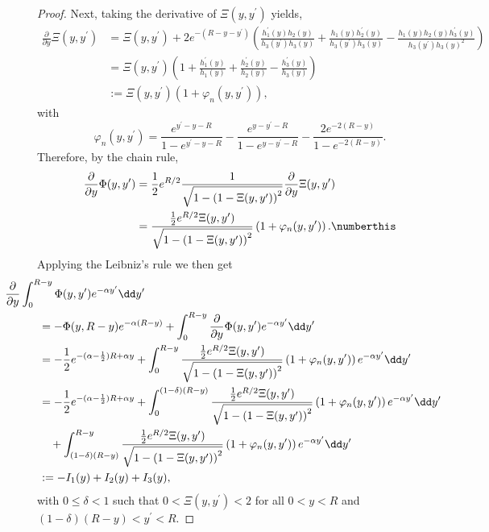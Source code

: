 \begin{proof}
Next, taking the derivative of $\Xi(y,y^\prime)$ yields,
\begin{align*}
	\frac{\partial}{\partial y} \Xi(y,y^\prime) &= \Xi(y,y^\prime) + 2 e^{-(R - y - y^\prime)}
		\left(\frac{h_1^\prime(y) h_2(y)}{h_3(y^\prime) h_3(y)} + \frac{h_1(y)h_2^\prime(y)}{h_3(y^\prime) h_3(y)}
		- \frac{h_1(y) h_2(y) h_3^\prime(y)}{h_3(y^\prime) h_3(y)^2}\right)\\
	&= \Xi(y,y^\prime)\left(1 + \frac{h_1^\prime(y)}{h_1(y)} + \frac{h_2^\prime(y)}{h_2(y)} 
		- \frac{h_3^\prime(y)}{h_3(y)}\right)\\
	&:= \Xi(y,y^\prime)\left(1 + \varphi_n(y,y^\prime)\right),
\end{align*}
with
\[
	\varphi_n(y,y^\prime) = \frac{e^{y^\prime - y- R}}{1 - e^{y^\prime - y - R}} 
	- \frac{e^{y - y^\prime - R}}{1 - e^{y - y^\prime - R}} - \frac{2e^{-2(R - y)}}{1 - e^{-2(R-y)}}. 
\]
Therefore, by the chain rule,
\begin{align*}
	\frac{\partial}{\partial y} \Phi(y, y^\prime)
	&= \frac{1}{2}e^{R/2} \frac{1}{\sqrt{1 - \left(1 - \Xi(y,y^\prime)\right)^2}} 
		\frac{\partial}{\partial y} \Xi(y,y^\prime)\\
	&=  \frac{ \frac{1}{2}e^{R/2} \Xi(y,y^\prime)}{\sqrt{1 - \left(1 - \Xi(y,y^\prime)\right)^2}}\left(1 + 
		\varphi_n(y,y^\prime)\right). \numberthis \label{eq:derivative_Phi}
\end{align*}
Applying the Leibniz's rule we then get
\begin{align*}
	&\hspace{-30pt}\frac{\partial}{\partial y} \int_0^{R - y} \Phi(y,y^\prime) e^{-\alpha y^\prime} \dd y^\prime\\
	&= - \Phi(y,R - y)e^{-\alpha(R-y)} + \int_0^{R - y} \frac{\partial}{\partial y}  \Phi(y,y^\prime) 
		 e^{-\alpha y^\prime} \dd y^\prime\\
	&= -\frac{1}{2}e^{-(\alpha-\frac{1}{2})R + \alpha y} + \int_0^{R- y} \frac{ \frac{1}{2}e^{R/2} \Xi(y,y^\prime)}{\sqrt{1 - \left(1 - \Xi(y,y^\prime)\right)^2}}
		\left(1 + \varphi_n(y,y^\prime)\right) e^{-\alpha y^\prime} \dd y^\prime\\
	&= -\frac{1}{2}e^{-(\alpha-\frac{1}{2})R + \alpha y}  + \int_0^{(1-\delta)(R- y)} \frac{ \frac{1}{2}e^{R/2} \Xi(y,y^\prime)}
		{\sqrt{1 - \left(1 - \Xi(y,y^\prime)\right)^2}}
		\left(1 + \varphi_n(y,y^\prime)\right) e^{-\alpha y^\prime} \dd y^\prime\\
	&\hspace{10pt}+ \int_{(1-\delta)(R- y)}^{R - y} \frac{ \frac{1}{2}e^{R/2} \Xi(y,y^\prime)}
			{\sqrt{1 - \left(1 - \Xi(y,y^\prime)\right)^2}}
			\left(1 + \varphi_n(y,y^\prime)\right) e^{-\alpha y^\prime} \dd y^\prime\\
	&:= -I_1(y) + I_2(y) + I_3(y),
\end{align*}
with $0 \le \delta < 1$ such that $0 < \Xi(y,y^\prime) < 2$ for all $0 < y < R$ and $(1-\delta)(R-y) < y^\prime < R$.


\end{proof}

